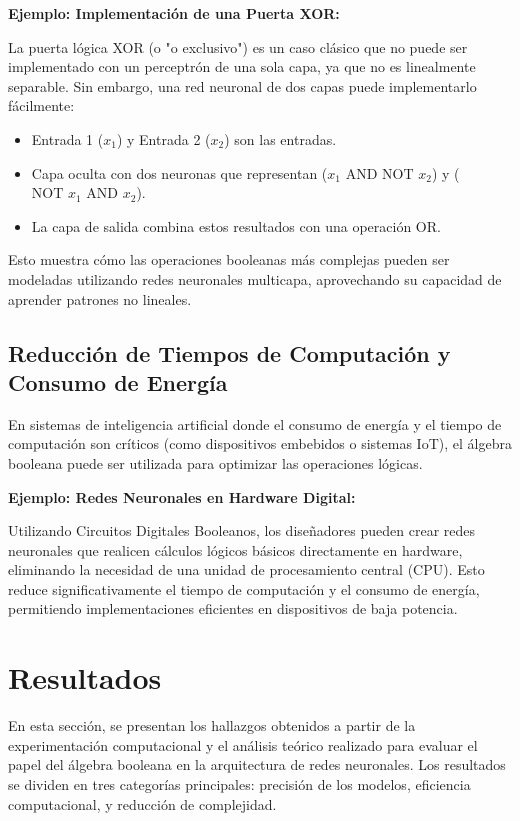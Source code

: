 \documentclass{article}
\begin{document}
\begin{multicols}{2}
\textbf{Ejemplo: Implementación de una Puerta XOR:}

La puerta lógica XOR (o "o exclusivo") es un caso clásico que no puede ser implementado 
con un perceptrón de una sola capa, ya que no es linealmente separable. Sin embargo, 
una red neuronal de dos capas puede implementarlo fácilmente:

\begin{itemize}
    \item Entrada 1 (\(x_1\)) y Entrada 2 (\(x_2\)) son las entradas.
    \item Capa oculta con dos neuronas que representan (\(x_1 \text{ AND NOT } x_2\)) y (\(\text{NOT } x_1 \text{ AND } x_2\)).
    \item La capa de salida combina estos resultados con una operación OR.
\end{itemize}

Esto muestra cómo las operaciones booleanas más complejas pueden ser modeladas utilizando 
redes neuronales multicapa, aprovechando su capacidad de aprender patrones no lineales.

\subsection{Reducción de Tiempos de Computación y Consumo de Energía}

En sistemas de inteligencia artificial donde el consumo de energía y el tiempo de 
computación son críticos (como dispositivos embebidos o sistemas IoT), el álgebra booleana puede ser utilizada para optimizar las operaciones lógicas.

\textbf{Ejemplo: Redes Neuronales en Hardware Digital:}

Utilizando Circuitos Digitales Booleanos, los diseñadores pueden crear redes neuronales 
que realicen cálculos lógicos básicos directamente en hardware, eliminando la necesidad 
de una unidad de procesamiento central (CPU). Esto reduce significativamente el tiempo de 
computación y el consumo de energía, permitiendo implementaciones eficientes en dispositivos 
de baja potencia.


\section{Resultados}
En esta sección, se presentan los hallazgos obtenidos a partir de la experimentación computacional y el análisis teórico realizado para evaluar el papel del álgebra booleana en la arquitectura de redes neuronales. Los resultados se dividen en tres categorías principales: precisión de los modelos, eficiencia computacional, y reducción de complejidad.


\end{multicols}
\end{document}
